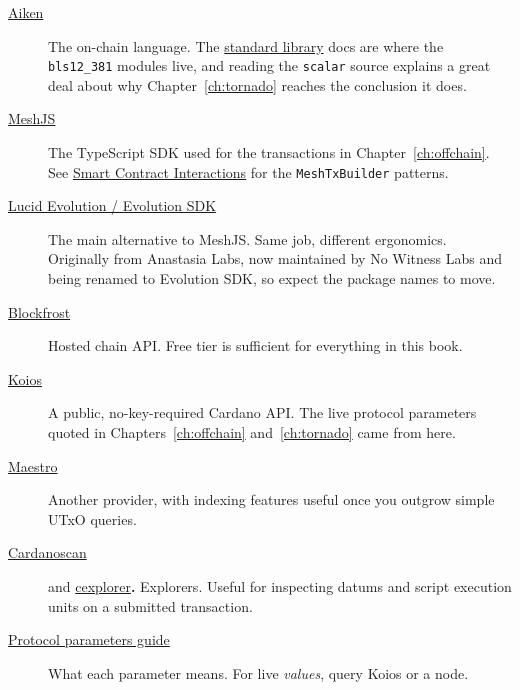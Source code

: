 \begin{description}
  \item[\href{https://aiken-lang.org/}{Aiken}]
    The on-chain language. The
    \href{https://aiken-lang.github.io/stdlib/}{standard library} docs are
    where the \texttt{bls12\_381} modules live, and reading the
    \texttt{scalar} source explains a great deal about why
    Chapter~\ref{ch:tornado} reaches the conclusion it does.

  \item[\href{https://meshjs.dev/}{MeshJS}]
    The TypeScript SDK used for the transactions in
    Chapter~\ref{ch:offchain}. See
    \href{https://meshjs.dev/apis/txbuilder/smart-contracts}{Smart Contract Interactions}
    for the \texttt{MeshTxBuilder} patterns.

  \item[\href{https://github.com/no-witness-labs/lucid-evolution}{Lucid Evolution / Evolution SDK}]
    The main alternative to MeshJS. Same job, different ergonomics. Originally
    from Anastasia Labs, now maintained by No Witness Labs and being renamed to
    Evolution SDK, so expect the package names to move.

  \item[\href{https://blockfrost.io/}{Blockfrost}]
    Hosted chain API. Free tier is sufficient for everything in this book.

  \item[\href{https://www.koios.rest/}{Koios}]
    A public, no-key-required Cardano API. The live protocol parameters quoted
    in Chapters~\ref{ch:offchain} and~\ref{ch:tornado} came from here.

  \item[\href{https://gomaestro.org/}{Maestro}]
    Another provider, with indexing features useful once you outgrow simple
    UTxO queries.

  \item[\href{https://cardanoscan.io/}{Cardanoscan}] and
    \href{https://cexplorer.io/}{cexplorer}\textbf{.}
    Explorers. Useful for inspecting datums and script execution units on a
    submitted transaction.

  \item[\href{https://docs.cardano.org/about-cardano/explore-more/parameter-guide}{Protocol parameters guide}]
    What each parameter means. For live \emph{values}, query Koios or a node.
\end{description}

